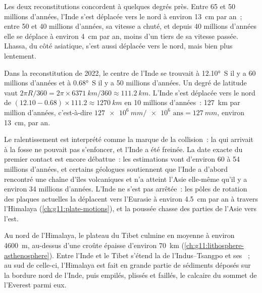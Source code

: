 Les deux reconstitutions concordent à quelques degrés près. Entre 65 et 50
millions d'années, l'Inde s'est déplacée vers le nord à environ
\qty{13}{cm} par an~; entre 50 et 40 millions d'années, sa vitesse a
chuté, et depuis 40 millions d'années elle se déplace à environ
\qty{4}{cm} par an, moins d'un tiers de sa vitesse passée. Lhassa, du côté
asiatique, s'est aussi déplacée vers le nord, mais bien plus lentement.

\begin{example}\label{ex:g12:mountain-building:india}
Dans la reconstitution de 2022, le centre de l'Inde se trouvait à
\ang{12.10}~S il y a 60 millions d'années et à \ang{0.68}~S il y a 50
millions d'années. Un degré de latitude vaut
$2\pi R/360 = 2\pi \times \qty{6371}{km}/360 \approx \qty{111.2}{km}$.
L'Inde s'est déplacée vers le nord de
$(12.10 - 0.68) \times 111.2 \approx \qty{1270}{km}$ en 10 millions
d'années~: \qty{127}{km} par million d'années, c'est-à-dire $\qty{127e6}{mm} /
\num{e6}\text{ ans} = \qty{127}{mm}$, environ \qty{13}{cm}, par an.
\end{example}

Le ralentissement est interprété comme la marque de la collision~: la
 qui arrivait à la fosse ne pouvait pas s'enfoncer, et
l'Inde a été freinée. La date exacte du premier contact est encore
débattue~: les estimations vont d'environ 60 à 54 millions d'années, et
certains géologues soutiennent que l'Inde a d'abord rencontré une chaîne
d'îles volcaniques et n'a atteint l'Asie elle-même qu'il y a environ 34
millions d'années. L'Inde ne s'est pas arrêtée~: les pôles de rotation des
plaques actuelles la déplacent vers l'Eurasie à environ \qty{4.5}{cm} par
an à travers l'Himalaya (\cref{ch:g11:plate-motions}), et la poussée chasse
des parties de l'Asie vers l'est.

Au nord de l'Himalaya, le plateau du Tibet culmine en moyenne à environ
\qty{4600}{m}, au-dessus d'une croûte épaisse d'environ \qty{70}{km}
(\cref{ch:g11:lithosphere-asthenosphere}). Entre l'Inde et le Tibet
s'étend la  de l'Indus--Tsangpo et ses ~; au sud de
celle-ci, l'Himalaya est fait en grande partie de sédiments déposés sur la
bordure nord de l'Inde, puis empilés, plissés et faillés, le calcaire du
sommet de l'Everest parmi eux.

